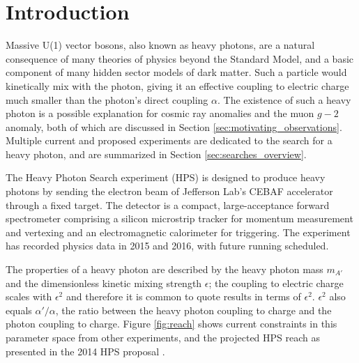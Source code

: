 \chapter{Introduction}
Massive U(1) vector bosons, also known as heavy photons, are a natural consequence of many theories of physics beyond the Standard Model, and a basic component of many hidden sector models of dark matter.
Such a particle would kinetically mix with the photon, giving it an effective coupling to electric charge much smaller than the photon's direct coupling $\alpha$.
The existence of such a heavy photon is a possible explanation for cosmic ray anomalies and the muon $g-2$ anomaly, both of which are discussed in Section \ref{sec:motivating_observations}.
Multiple current and proposed experiments are dedicated to the search for a heavy photon, and are summarized in Section \ref{sec:searches_overview}.

The Heavy Photon Search experiment (HPS) is designed to produce heavy photons by sending the electron beam of Jefferson Lab's CEBAF accelerator through a fixed target.
The detector is a compact, large-acceptance forward spectrometer comprising a silicon microstrip tracker for momentum measurement and vertexing and an electromagnetic calorimeter for triggering.
The experiment has recorded physics data in 2015 and 2016, with future running scheduled.

The properties of a heavy photon are described by the heavy photon mass $m_{A'}$ and the dimensionless kinetic mixing strength $\epsilon$; the coupling to electric charge scales with $\epsilon^2$ and therefore it is common to quote results in terms of $\epsilon^2$.
$\epsilon^2$ also equals $\alpha'/\alpha$, the ratio between the heavy photon coupling to charge and the photon coupling to charge.
Figure \ref{fig:reach} shows current constraints in this parameter space from other experiments, and the projected HPS reach as presented in the 2014 HPS proposal \cite{collaboration_heavy_2013}.

